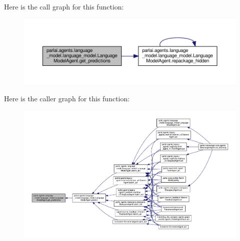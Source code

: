 Here is the call graph for this function\+:
\nopagebreak
\begin{figure}[H]
\begin{center}
\leavevmode
\includegraphics[width=350pt]{classparlai_1_1agents_1_1language__model_1_1language__model_1_1LanguageModelAgent_aa3de87163cd61e4195afc0ccf801699b_cgraph}
\end{center}
\end{figure}
Here is the caller graph for this function\+:
\nopagebreak
\begin{figure}[H]
\begin{center}
\leavevmode
\includegraphics[width=350pt]{classparlai_1_1agents_1_1language__model_1_1language__model_1_1LanguageModelAgent_aa3de87163cd61e4195afc0ccf801699b_icgraph}
\end{center}
\end{figure}
\mbox{\label{classparlai_1_1agents_1_1language__model_1_1language__model_1_1LanguageModelAgent_aeb1136a4ae2a2a1e8c0d5a7b75d9898f}} 

